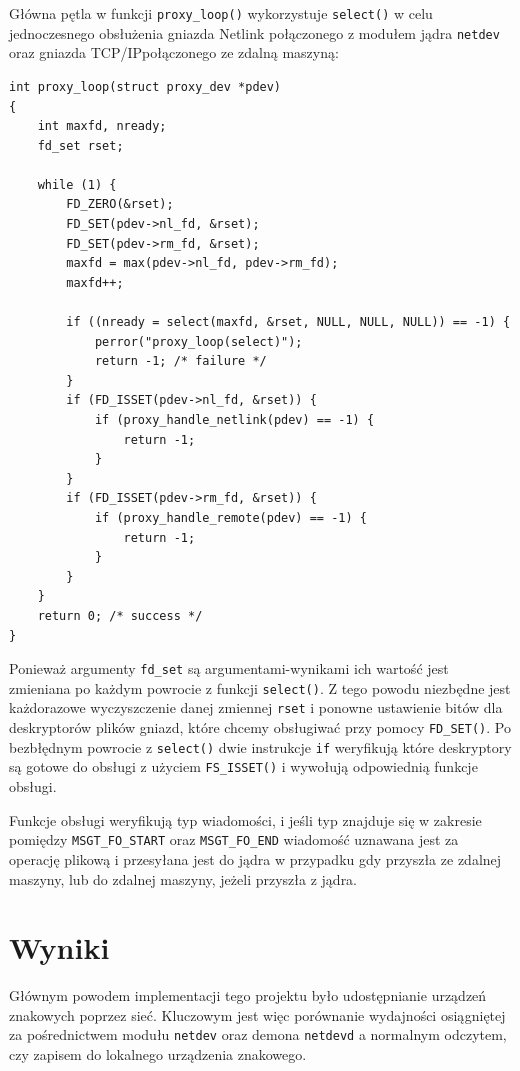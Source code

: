 \documentclass[11pt]{scrartcl}
\let\stdsection\section
\renewcommand\section{\newpage\stdsection}
\begin{document}
Główna pętla w funkcji \texttt{proxy\_loop()} wykorzystuje \texttt{select()} w celu jednoczesnego obsłużenia gniazda Netlink połączonego z modułem jądra \texttt{netdev} oraz gniazda TCP/IP\@ połączonego ze zdalną maszyną:

\begin{verbatim}
int proxy_loop(struct proxy_dev *pdev)
{
    int maxfd, nready;
    fd_set rset;

    while (1) {
        FD_ZERO(&rset);
        FD_SET(pdev->nl_fd, &rset);
        FD_SET(pdev->rm_fd, &rset);
        maxfd = max(pdev->nl_fd, pdev->rm_fd);
        maxfd++;

        if ((nready = select(maxfd, &rset, NULL, NULL, NULL)) == -1) {
            perror("proxy_loop(select)");
            return -1; /* failure */
        }
        if (FD_ISSET(pdev->nl_fd, &rset)) {
            if (proxy_handle_netlink(pdev) == -1) {
                return -1;
            }
        }
        if (FD_ISSET(pdev->rm_fd, &rset)) {
            if (proxy_handle_remote(pdev) == -1) {
                return -1;
            }
        }
    }
    return 0; /* success */
}
\end{verbatim}

Ponieważ argumenty \texttt{fd\_set} są argumentami-wynikami ich wartość jest zmieniana po każdym powrocie z funkcji \texttt{select()}. Z tego powodu niezbędne jest każdorazowe wyczyszczenie danej zmiennej \texttt{rset} i ponowne ustawienie bitów dla deskryptorów plików gniazd, które chcemy obsługiwać przy pomocy \texttt{FD\_SET()}. Po bezbłędnym powrocie z \texttt{select()} dwie instrukcje \texttt{if} weryfikują które deskryptory są gotowe do obsługi z użyciem \texttt{FS\_ISSET()} i wywołują odpowiednią funkcje obsługi.

Funkcje obsługi weryfikują typ wiadomości, i jeśli typ znajduje się w zakresie pomiędzy \texttt{MSGT\_FO\_START} oraz \texttt{MSGT\_FO\_END} wiadomość uznawana jest za operację plikową i przesyłana jest do jądra w przypadku gdy przyszła ze zdalnej maszyny, lub do zdalnej maszyny, jeżeli przyszła z jądra.

\section{Wyniki}

Głównym powodem implementacji tego projektu było udostępnianie urządzeń znakowych poprzez sieć. Kluczowym jest więc porównanie wydajności osiągniętej za pośrednictwem modułu \texttt{netdev} oraz demona \texttt{netdevd} a normalnym odczytem, czy zapisem do lokalnego urządzenia znakowego.
\end{document}
